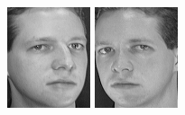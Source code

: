\begin{figure}[ht]
 \includegraphics[width=\columnwidth/11]{ch3/figures/s1_5.png}
 \includegraphics[width=\columnwidth/11]{ch3/figures/s1_6.png}

\end{figure}
